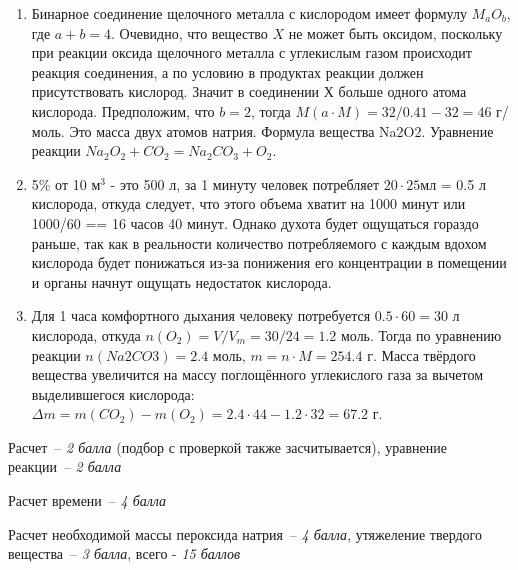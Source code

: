 \solutionSection

\begin{enumerate}
    \item Бинарное соединение щелочного металла с кислородом имеет формулу $M_aO_b$, где $a+b=4$. Очевидно, что 
    вещество $X$ не может быть оксидом, поскольку при реакции оксида щелочного металла с углекислым газом 
    происходит реакция соединения, а по условию в продуктах реакции должен присутствовать кислород. Значит в 
    соединении Х больше одного атома кислорода. Предположим, что $b=2$, тогда $M(a \cdot M) = 32/0.41 - 32 = 46$ 
    г/моль. Это масса двух атомов натрия. Формула вещества Na2O2. Уравнение реакции $Na_2O_2 + CO_2 = Na_2CO_3 + O_2$.
    \item 5\% от 10 м$^3$ - это 500 л, за 1 минуту человек потребляет $20\cdot 25$мл = 0.5 л кислорода, откуда 
    следует, что этого объема хватит на 1000 минут или 1000/60 =\linebreak = 16 часов 40 минут. Однако духота будет ощущаться 
    гораздо раньше, так как в реальности количество потребляемого с каждым вдохом кислорода будет понижаться из-за 
    понижения его концентрации в помещении и органы начнут ощущать недостаток кислорода.
    \item Для 1 часа комфортного дыхания человеку потребуется $0.5 \cdot 60 = 30$ л кислорода, откуда $n(O_2) = V/V_m = 30/24 = 1.2$ моль. Тогда 
    по уравнению реакции $n(Na2CO3) = 2.4$ моль, $m =n \cdot M = 254.4$ г. Масса твёрдого вещества увеличится на 
    массу поглощённого углекислого газа за вычетом выделившегося кислорода: $\Delta m = m(CO_2) - m(O_2) = 2.4 \cdot 44 - 1.2 \cdot 32 = 67.2$ г.
\end{enumerate}

\additionalCriteria

Расчет~-- \textit{2 балла} (подбор с проверкой также засчитывается), уравнение реакции~-- \textit{2 балла}

Расчет времени~-- \textit{4 балла}

Расчет необходимой массы пероксида натрия~-- \textit{4 балла}, утяжеление твердого вещества~-- \textit{3 балла}, всего - \textit{15 баллов}